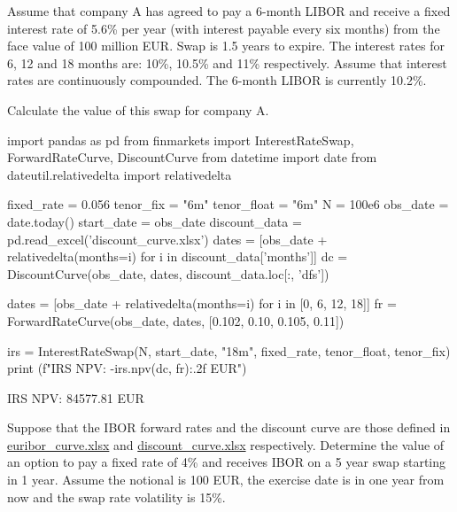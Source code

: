 \begin{question}
Assume that company A has agreed to pay a 6-month LIBOR and receive a fixed interest rate of 5.6\% per year (with interest payable every six months) from the face value of 100 million EUR. Swap is 1.5 years to expire. The interest rates for 6, 12 and 18 months are: 10\%, 10.5\% and 11\% respectively. Assume that interest rates are continuously compounded. The 6-month LIBOR is currently 10.2\%. 

Calculate the value of this swap for company A.
\end{question}

\cprotEnv\begin{solution}
\begin{ipython}
import pandas as pd
from finmarkets import InterestRateSwap, ForwardRateCurve, DiscountCurve
from datetime import date
from dateutil.relativedelta import relativedelta

fixed_rate = 0.056
tenor_fix = "6m"
tenor_float = "6m"
N = 100e6
obs_date = date.today()
start_date = obs_date 
discount_data = pd.read_excel('discount_curve.xlsx')
dates = [obs_date + relativedelta(months=i) for i in discount_data['months']]
dc = DiscountCurve(obs_date, dates, discount_data.loc[:, 'dfs'])

dates = [obs_date + relativedelta(months=i) for i in [0, 6, 12, 18]]
fr = ForwardRateCurve(obs_date, dates, [0.102, 0.10, 0.105, 0.11])

irs = InterestRateSwap(N, start_date, "18m", fixed_rate, tenor_float, tenor_fix)
print (f"IRS NPV: {-irs.npv(dc, fr):.2f} EUR")
\end{ipython}
\begin{ioutput}
IRS NPV: 84577.81 EUR
\end{ioutput}
\end{solution}

\begin{question}
Suppose that the IBOR forward rates and the discount curve are those defined in
\href{https://github.com/matteosan1/finance_course/raw/master/input_files/euribor_curve.xlsx}{euribor\_curve.xlsx} and \href{https://github.com/matteosan1/finance_course/raw/master/input_files/discount_curve.xlsx}{discount\_curve.xlsx} respectively.
Determine the value of an option to pay a fixed rate of 4\% and receives IBOR on a 5 year swap starting in 1 year. Assume the notional is 100 EUR, the exercise date is in one year from now and the swap rate volatility is 15\%.
\end{question}

